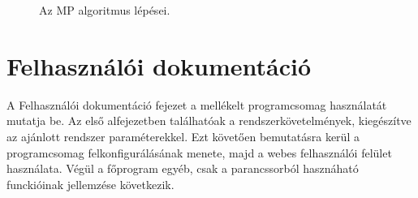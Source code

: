 \documentclass[oneside,titlepage,12pt,a4paper]{report}
\begin{document}
\begin{figure}[htb!]
\caption{Az MP algoritmus lépései.}
\label{fig:mpstep}
\end{figure}


\chapter{Felhasználói dokumentáció} \label{ch::userGuide}

A Felhasználói dokumentáció fejezet a mellékelt programcsomag használatát mutatja be. Az első alfejezetben találhatóak a rendszerkövetelmények, kiegészítve az ajánlott rendszer paraméterekkel. Ezt követően bemutatásra kerül a programcsomag felkonfigurálásának menete, majd a webes felhasználói felület használata. Végül a főprogram egyéb, csak a parancssorból hasznáható funckióinak jellemzése következik.
\end{document}
